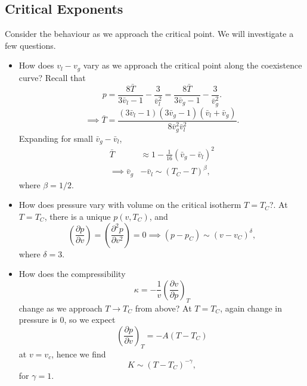 \documentclass[12pt]{article}
\begin{document}
\subsection{Critical Exponents}
\label{sub:ce}

Consider the behaviour as we approach the critical point. We will investigate a few questions.
\begin{itemize}
	\item How does $v_l - v_g$ vary as we approach the critical point along the coexistence curve? Recall that
		\[
		p = \frac{8 \bar T}{3 \bar v_l - 1} - \frac{3}{\bar v_l^2} = \frac{8 \bar T}{3 \bar v_g - 1} - \frac{3}{\bar v_g^2}.
		\]
		\[
		\implies \bar T = \frac{(3 \bar v_l - 1)(3 \bar v_g - 1)(\bar v_l + \bar v_g)}{8 \bar v_g^2 \bar v_l^2}.
		\]
		Expanding for small $\bar v_g - \bar v_l$,
		\begin{align*}
			\bar T &\approx 1 - \frac{1}{16}(\bar v_g - \bar v_l)^2 \\
			\implies \bar v_g &- \bar v_l \sim (T_C - T)^\beta,
		\end{align*}
		where $\beta = 1/2$.
	\item How does pressure vary with volume on the critical isotherm $T = T_C$?. At $T = T_C$, there is a unique $p(v, T_C)$, and
		\[
		\left( \frac{\partial p}{\partial v} \right) = \left( \frac{\partial^2 p}{\partial v^2} \right) = 0 \implies (p - p_C) \sim (v - v_C)^\delta,
		\]
		where $\delta = 3$.
	\item How does the compressibility
		\[
		\kappa = - \frac{1}{v} \left( \frac{\partial v}{\partial p} \right)_T
		\]
		change as we approach $T \to T_C$ from above? At $T = T_C$, again change in pressure is $0$, so we expect
		\[
		\left( \frac{\partial p}{\partial v} \right)_T = - A(T - T_C)
		\]
		at $v = v_c$, hence we find
		\[
		K \sim (T - T_C)^{-\gamma},
		\]
		for $\gamma = 1$.
\end{itemize}
\end{document}

